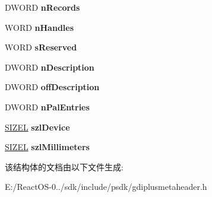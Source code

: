 \begin{DoxyCompactItemize}
D\+W\+O\+RD {\bfseries n\+Records}
\item 
\mbox{\label{struct_e_n_h_m_e_t_a_h_e_a_d_e_r3_ac6b5aff422d7a852727f9faaac94c540}} 
W\+O\+RD {\bfseries n\+Handles}
\item 
\mbox{\label{struct_e_n_h_m_e_t_a_h_e_a_d_e_r3_a357bb306f1b25a32e47b33837a5f066e}} 
W\+O\+RD {\bfseries s\+Reserved}
\item 
\mbox{\label{struct_e_n_h_m_e_t_a_h_e_a_d_e_r3_a0b60f2de67c37c982c86eabb6d63b085}} 
D\+W\+O\+RD {\bfseries n\+Description}
\item 
\mbox{\label{struct_e_n_h_m_e_t_a_h_e_a_d_e_r3_ac71390fb5efa406d99f298dc12d16ab6}} 
D\+W\+O\+RD {\bfseries off\+Description}
\item 
\mbox{\label{struct_e_n_h_m_e_t_a_h_e_a_d_e_r3_aa38c67243c46dd654585ffdf345567ac}} 
D\+W\+O\+RD {\bfseries n\+Pal\+Entries}
\item 
\mbox{\label{struct_e_n_h_m_e_t_a_h_e_a_d_e_r3_a5b2744decb1da6798b85a838933af672}} 
\hyperlink{structtag_s_i_z_e}{S\+I\+Z\+EL} {\bfseries szl\+Device}
\item 
\mbox{\label{struct_e_n_h_m_e_t_a_h_e_a_d_e_r3_abfb2246a9b4a5d3c461e18a0ccdbe24f}} 
\hyperlink{structtag_s_i_z_e}{S\+I\+Z\+EL} {\bfseries szl\+Millimeters}
\end{DoxyCompactItemize}


该结构体的文档由以下文件生成\+:\begin{DoxyCompactItemize}
\item 
E\+:/\+React\+O\+S-\/0../sdk/include/psdk/gdiplusmetaheader.\+h\end{DoxyCompactItemize}
